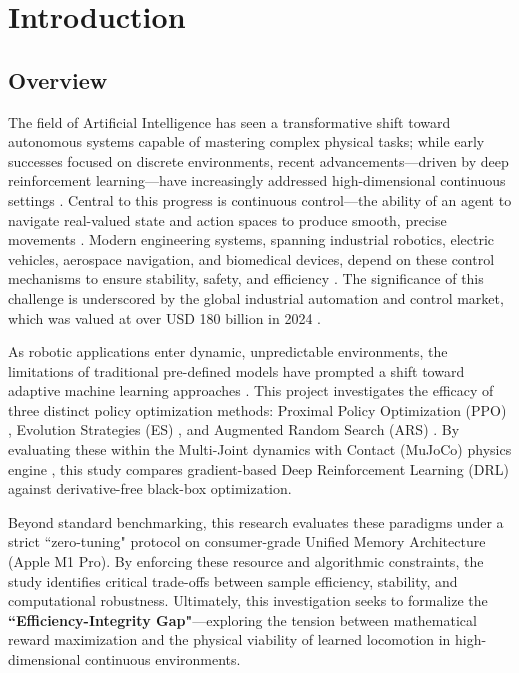 %
%
\chapter{Introduction}
\label{chap:intro}
\setlength{\parskip}{1em}
%
%

\section{Overview}

The field of Artificial Intelligence has seen a transformative shift toward autonomous systems capable of mastering complex physical tasks; while early successes focused on discrete environments, recent advancements—driven by deep reinforcement learning—have increasingly addressed high-dimensional continuous settings \citep{lillicrap2015ddpg}. Central to this progress is continuous control—the ability of an agent to navigate real-valued state and action spaces to produce smooth, precise movements \citep{seif2016autonomous}. Modern engineering systems, spanning industrial robotics, electric vehicles, aerospace navigation, and biomedical devices, depend on these control mechanisms to ensure stability, safety, and efficiency \citep{pokharel2024comprehensive}. The significance of this challenge is underscored by the global industrial automation and control market, which was valued at over USD 180 billion in 2024 \citep{pokharel2024comprehensive}.

As robotic applications enter dynamic, unpredictable environments, the limitations of traditional pre-defined models have prompted a shift toward adaptive machine learning approaches \citep{shahid2022manipulation}. This project investigates the efficacy of three distinct policy optimization methods: Proximal Policy Optimization (PPO) \citep{schulman2017ppo}, Evolution Strategies (ES) \citep{salimans2017es}, and Augmented Random Search (ARS) \citep{mania2018randomsearch}. By evaluating these within the Multi-Joint dynamics with Contact (MuJoCo) physics engine \citep{todorov2012mujoco}, this study compares gradient-based Deep Reinforcement Learning (DRL) against derivative-free black-box optimization.

Beyond standard benchmarking, this research evaluates these paradigms under a strict ``zero-tuning" protocol on consumer-grade Unified Memory Architecture (Apple M1 Pro). By enforcing these resource and algorithmic constraints, the study identifies critical trade-offs between sample efficiency, stability, and computational robustness. Ultimately, this investigation seeks to formalize the \textbf{``Efficiency-Integrity Gap"}—exploring the tension between mathematical reward maximization and the physical viability of learned locomotion in high-dimensional continuous environments.

